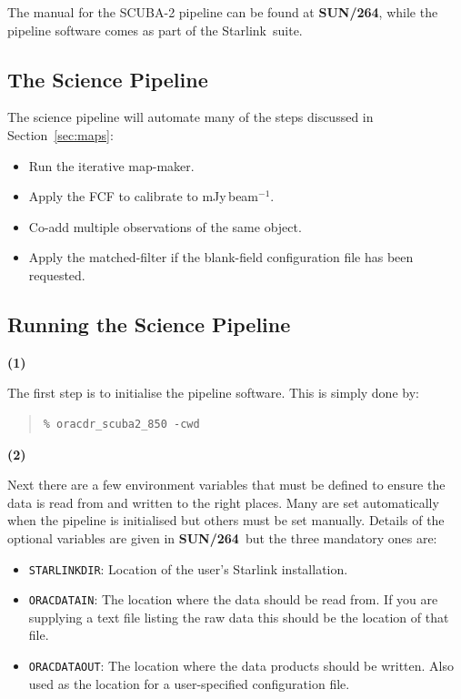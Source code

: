 \documentclass[twoside,11pt]{article}
\newcommand{\htmladdnormallink}[2]{#1}
\newcommand{\xref}[3]{#1}
\newcommand{\xlabel}[1]{}
\renewcommand{\_}{\texttt{\symbol{95}}}
\newenvironment{myquote}{\begin{quote}\begin{small}}{\end{small}\end{quote}}
\newcommand{\starlink}{\htmladdnormallink{Starlink}{http://starlink.jach.hawaii.edu}}
\newcommand{\param}[1]{\texttt{#1}}
\newcommand{\pipelinesun}{\xref{\textbf{SUN/264}}{sun264}{}}
\begin{document}
The manual for the SCUBA-2 pipeline can be found at \pipelinesun,
while the pipeline software comes as part of the \starlink\ suite.


\subsection{\xlabel{science_pl}The Science Pipeline}
The science pipeline will automate many of the steps discussed in
Section~\ref{sec:maps}:
\vspace{-0.3cm}
\begin{itemize}\itemsep-0.3em
\item Run the iterative map-maker.
\item Apply the FCF to calibrate to mJy\,beam$^{-1}$.
\item Co-add multiple observations of the same object.
\item Apply the matched-filter if the blank-field configuration file
      has been requested.
\end{itemize}

\subsection{\xlabel{running_pl}Running the Science Pipeline}
\begin{minipage}[t]{0.05\linewidth}
\textbf{(1)}
\end{minipage}
\begin{minipage}[t]{0.95\linewidth}
The first step is to initialise the pipeline software. This is simply done by:
\begin{myquote}
\begin{verbatim}
% oracdr_scuba2_850 -cwd

\end{verbatim}
\end{myquote}
\end{minipage}

\begin{minipage}[t]{0.05\linewidth}
\textbf{(2)}
\end{minipage}
\begin{minipage}[t]{0.95\linewidth}
Next there are a few environment variables that must be defined to
ensure the data is read from and written to the right places. Many are
set automatically when the pipeline is initialised but others must be
set manually. Details of the optional variables are given in
\pipelinesun\ but the three mandatory ones are:
\begin{itemize}\itemsep-0.1em
\item \param{STARLINK\_DIR}: Location of the user's Starlink installation.
\item \param{ORAC\_DATA\_IN}: The location where the data should be read from.
If you are supplying a text file listing the raw data this should be the
location of that file.
\item \param{ORAC\_DATA\_OUT}: The location where the data products should be
written. Also used as the location for a user-specified configuration file.\\
\end{itemize}
\end{minipage}
\end{document}
